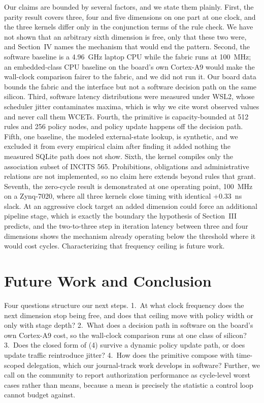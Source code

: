 \documentclass[conference]{IEEEtran}
\newcommand{\new}[1]{\textcolor{hkred}{#1}}
\begin{document}
Our claims are bounded by several factors, and we state them plainly. \new{First, the parity result covers three, four and five dimensions on one part at one clock, and the three kernels differ only in the conjunction terms of the rule check. We have not shown that an arbitrary sixth dimension is free, only that these two were, and Section~IV names the mechanism that would end the pattern.} \new{Second,} the software baseline is a 4.96~GHz laptop CPU while the fabric runs at 100~MHz; an embedded-class CPU baseline on the board's own Cortex-A9 would make the wall-clock comparison fairer to the fabric, and we did not run it. \new{Our board data bounds the fabric and the interface but not a software decision path on the same silicon.} \new{Third,} software latency distributions were measured under WSL2, whose scheduler jitter contaminates maxima, which is why we cite worst observed values and never call them WCETs. \new{Fourth,} the primitive is capacity-bounded at 512 rules and 256 policy nodes, and policy update happens off the decision path. \new{Fifth,} one baseline, the modeled external-state lookup, is synthetic, and we excluded it from every empirical claim after finding it added nothing the measured SQLite path does not show. \new{Sixth,} the kernel compiles only the association subset of INCITS 565. Prohibitions, obligations and administrative relations are not implemented, so no claim here extends beyond rules that grant. \new{Seventh,} the zero-cycle result is demonstrated at one operating point, 100~MHz on a Zynq-7020, where \new{all three} kernels close timing with identical +0.33~ns slack. At an aggressive clock target \new{an} added dimension could force an additional pipeline stage, which is exactly the boundary the hypothesis of Section~III predicts\new{, and the two-to-three step in iteration latency between three and four dimensions shows the mechanism already operating below the threshold where it would cost cycles}. Characterizing that frequency ceiling is future work.

\section{Future Work and Conclusion}

Four questions structure our next steps. \new{1.~At what clock frequency does the next dimension stop being free, and does that ceiling move with policy width or only with stage depth? 2.~What does a decision path in software on the board's own Cortex-A9 cost, so the wall-clock comparison runs at one class of silicon?} 3.~Does the closed form of (4) survive a dynamic policy update path, or does update traffic reintroduce jitter? 4.~How does the primitive compose with time-scoped delegation, which our journal-track work develops in software? Further, we call on the community to report authorization performance as cycle-level worst cases rather than means, because a mean is precisely the statistic a control loop cannot budget against.
\end{document}
